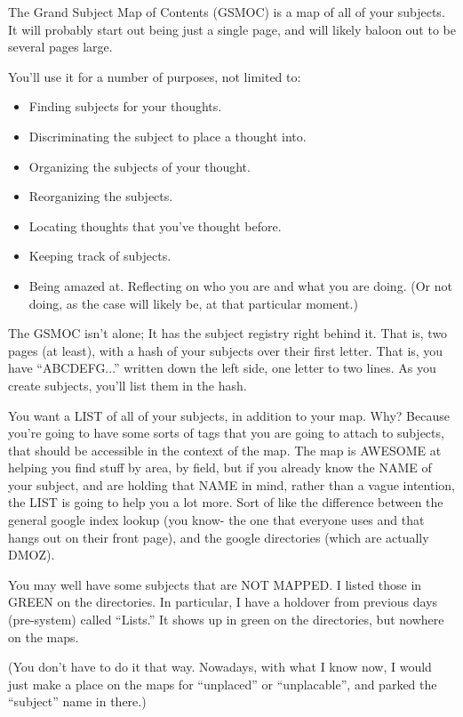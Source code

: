 \documentclass[oneside]{book}
\begin{document}
The Grand Subject Map of Contents (GSMOC) is a map of all of your
subjects. It will probably start out being just a single page, and
will likely baloon out to be several pages large.

You'll use it for a number of purposes, not limited to:
\begin{itemize}
\item Finding subjects for your thoughts.
\item Discriminating the subject to place a thought into.
\item Organizing the subjects of your thought.
\item Reorganizing the subjects.
\item Locating thoughts that you've thought before.
\item Keeping track of subjects.
\item Being amazed at. Reflecting on who you are and what you are
doing. (Or not doing, as the case will likely be, at that particular
moment.)
\end{itemize}

The GSMOC isn't alone; It has the subject registry right behind
it. That is, two pages (at least), with a hash of your subjects over
their first letter. That is, you have ``ABCDEFG...'' written down the
left side, one letter to two lines. As you create subjects, you'll
list them in the hash.

You want a LIST of all of your subjects, in addition to your map.
Why? Because you're going to have some sorts of tags that you are
going to attach to subjects, that should be accessible in the context
of the map. The map is AWESOME at helping you find stuff by area, by
field, but if you already know the NAME of your subject, and are
holding that NAME in mind, rather than a vague intention, the LIST is
going to help you a lot more. Sort of like the difference between the
general google index lookup (you know- the one that everyone uses and
that hangs out on their front page), and the google directories (which
are actually DMOZ).

You may well have some subjects that are NOT MAPPED. I listed those in
GREEN on the directories. In particular, I have a holdover from
previous days (pre-system) called ``Lists.'' It shows up in green on the
directories, but nowhere on the maps.

(You don't have to do it that way. Nowadays, with what I know now, I
would just make a place on the maps for ``unplaced'' or ``unplacable'',
and parked the ``subject'' name in there.)
\end{document}

